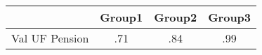 \begin{tabular}{l*{3}{c}}
\hline\hline
            &      Group1&      Group2&      Group3\\
\hline
Val UF Pension&         .71&         .84&         .99\\
\hline\hline
\end{tabular}
